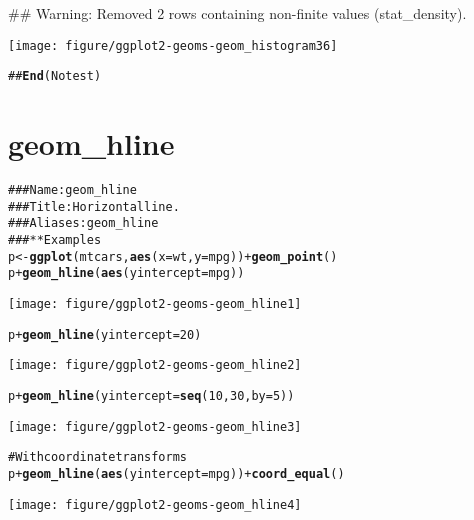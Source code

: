 \documentclass[a4paper,titlepage]{tufte-handout}\usepackage{graphicx, color}
\makeatletter
\def\maxwidth{ %
  \ifdim\Gin@nat@width>\linewidth
    \linewidth
  \else
    \Gin@nat@width
  \fi
}
\newcommand{\hlfunctioncall}[1]{\textcolor[rgb]{0.501960784313725,0,0.329411764705882}{\textbf{#1}}}%
\newcommand{\hlcomment}[1]{\textcolor[rgb]{0.180392156862745,0.6,0.341176470588235}{#1}}%
\newenvironment{kframe}{%
 \def\at@end@of@kframe{}%
 \ifinner\ifhmode%
  \def\at@end@of@kframe{\end{minipage}}%
  \begin{minipage}{\columnwidth}%
 \fi\fi%
 \def\FrameCommand##1{\hskip\@totalleftmargin \hskip-\fboxsep
 \colorbox{shadecolor}{##1}\hskip-\fboxsep
     \hskip-\linewidth \hskip-\@totalleftmargin \hskip\columnwidth}%
 \MakeFramed {\advance\hsize-\width
   \@totalleftmargin\z@ \linewidth\hsize
   \@setminipage}}%
 {\par\unskip\endMakeFramed%
 \at@end@of@kframe}
\newenvironment{knitrout}{}{} %
\makeatother
\begin{document}
\begin{knitrout}
\begin{kframe}
{\ttfamily\noindent\textcolor{warningcolor}{\#\# Warning: Removed 2 rows containing non-finite values (stat\_density).}}\end{kframe}\texttt{[image: figure/ggplot2-geoms-geom\_histogram36]} \begin{kframe}\begin{alltt}
\hlcomment{## \hlfunctioncall{End}(No test)}
\end{alltt}
\end{kframe}
\end{knitrout}


\section{geom\_hline}

\begin{knitrout}
\color{fgcolor}\begin{kframe}
\begin{alltt}
\hlcomment{### Name: geom_hline}
\hlcomment{### Title: Horizontal line.}
\hlcomment{### Aliases: geom_hline}
\hlcomment{### ** Examples}
p <- \hlfunctioncall{ggplot}(mtcars, \hlfunctioncall{aes}(x = wt, y=mpg)) + \hlfunctioncall{geom_point}()
p + \hlfunctioncall{geom_hline}(\hlfunctioncall{aes}(yintercept=mpg))
\end{alltt}
\end{kframe}\texttt{[image: figure/ggplot2-geoms-geom\_hline1]} \begin{kframe}\begin{alltt}
p + \hlfunctioncall{geom_hline}(yintercept=20)
\end{alltt}
\end{kframe}\texttt{[image: figure/ggplot2-geoms-geom\_hline2]} \begin{kframe}\begin{alltt}
p + \hlfunctioncall{geom_hline}(yintercept=\hlfunctioncall{seq}(10, 30, by=5))
\end{alltt}
\end{kframe}\texttt{[image: figure/ggplot2-geoms-geom\_hline3]} \begin{kframe}\begin{alltt}
\hlcomment{# With coordinate transforms}
p + \hlfunctioncall{geom_hline}(\hlfunctioncall{aes}(yintercept=mpg)) + \hlfunctioncall{coord_equal}()
\end{alltt}
\end{kframe}\texttt{[image: figure/ggplot2-geoms-geom\_hline4]} \begin{kframe}\begin{alltt}

\end{alltt}
\end{kframe}
\end{knitrout}
\end{document}
